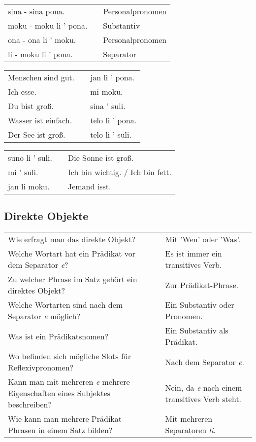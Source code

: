 \begin{supertabular}{p{5,5cm}|ll}
sina - sina pona. && Personalpronomen \\ %
moku - moku li ' pona. && Substantiv \\ %
ona - ona li ' moku. && Personalpronomen \\ %
li - moku li ' pona. && Separator \\ %
\end{supertabular}

\begin{supertabular}{p{5,5cm}|ll}
Menschen sind gut. && jan li ' pona. \\ %
Ich esse. && mi moku. \\ %
Du bist groß. && sina ' suli. \\ %
Wasser ist einfach. && telo li ' pona. \\ %
Der See ist groß. && telo li ' suli. \\ %
\end{supertabular}  

\begin{supertabular}{p{5,5cm}|ll}
suno li ' suli. && Die Sonne ist groß. \\
mi ' suli. && Ich bin wichtig. / Ich bin fett. \\
jan li moku. && Jemand isst. \\
\end{supertabular} 

\newpage
%
\subsection*{Direkte Objekte} 
\label{'direct_objects_compund_sentences'}

\begin{supertabular}{p{5,5cm}|ll}
Wie erfragt man das direkte Objekt? && Mit 'Wen' oder 'Was'. \\ %
Welche Wortart hat ein Prädikat vor dem Separator \textit{e}? && Es ist immer ein transitives Verb. \\ %
Zu welcher Phrase im Satz gehört ein direktes Objekt? && Zur Prädikat-Phrase. \\ %
Welche Wortarten sind nach dem Separator \textit{e} möglich? && Ein Substantiv oder Pronomen. \\ %
Was ist ein Prädikatsnomen?  && Ein Substantiv als Prädikat. \\ %
Wo befinden sich mögliche Slots für Reflexivpronomen? && Nach dem Separator \textit{e}. \\ %
Kann man mit mehreren \textit{e} mehrere Eigenschaften eines Subjektes beschreiben?  &&  Nein, da \textit{e} nach einem transitives Verb steht. \\ %
Wie kann man mehrere Prädikat-Phrasen in einem Satz bilden? && Mit mehreren Separatoren \textit{li}. \\ %
\end{supertabular}

